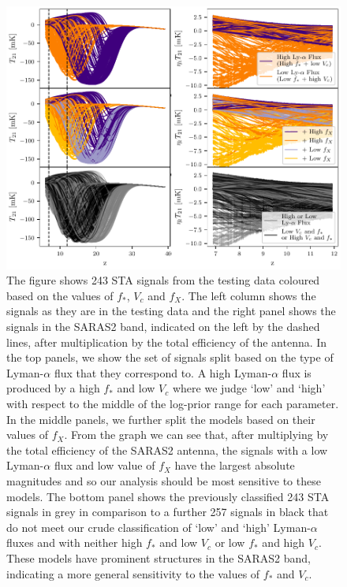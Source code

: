 \begin{figure}
    \centering
    \includegraphics{saras2/figs/sensitivity.pdf}
    \caption{The figure shows 243 STA signals from the testing data coloured based on the values of $f_*$, $V_c$ and $f_X$. The left column shows the signals as they are in the testing data and the right panel shows the signals in the SARAS2 band, indicated on the left by the dashed lines, after multiplication by the total efficiency of the antenna. In the top panels, we show the set of signals split based on the type of Lyman-$\alpha$ flux that they correspond to. A high Lyman-$\alpha$ flux is produced by a high $f_*$ and low $V_c$ where we judge `low' and `high' with respect to the middle of the log-prior range for each parameter. In the middle panels, we further split the models based on their values of $f_X$. From the graph we can see that, after multiplying by the total efficiency of the SARAS2 antenna, the signals with a low Lyman-$\alpha$ flux and low value of $f_X$ have the largest absolute magnitudes and so our analysis should be most sensitive to these models. The bottom panel shows the previously classified 243 STA signals in grey in comparison to a further 257 signals in black that do not meet our crude classification of `low' and `high' Lyman-$\alpha$ fluxes and with neither high $f_*$ and low $V_c$ or low $f_*$ and high $V_c$. These models have prominent structures in the SARAS2 band, indicating a more general sensitivity to the values of $f_*$ and $V_c$.}
    \label{fig:sensitivity}
\end{figure}

